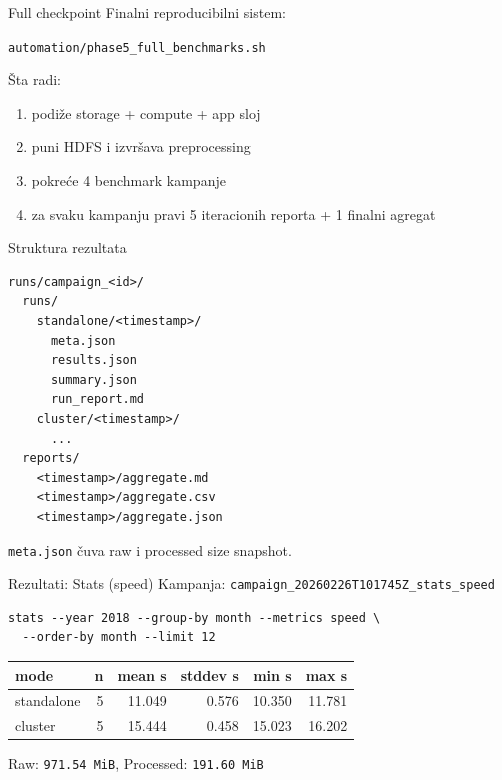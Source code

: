 \documentclass[aspectratio=169,11pt]{beamer}
\newcommand{\code}[1]{\texttt{\small #1}}
\begin{document}
\begin{frame}{Full checkpoint}
  Finalni reproducibilni sistem:
  \begin{center}
    \code{automation/phase5\_full\_benchmarks.sh}
  \end{center}

  \vspace{0.35cm}
  Šta radi:
  \begin{enumerate}
    \item podiže storage + compute + app sloj
    \item puni HDFS i izvršava preprocessing
    \item pokreće 4 benchmark kampanje
    \item za svaku kampanju pravi 5 iteracionih reporta + 1 finalni agregat
  \end{enumerate}
\end{frame}

\begin{frame}[fragile]{Struktura rezultata}
  \scriptsize
  \begin{verbatim}
runs/campaign_<id>/
  runs/
    standalone/<timestamp>/
      meta.json
      results.json
      summary.json
      run_report.md
    cluster/<timestamp>/
      ...
  reports/
    <timestamp>/aggregate.md
    <timestamp>/aggregate.csv
    <timestamp>/aggregate.json
  \end{verbatim}
  \normalsize

  \code{meta.json} čuva raw i processed size snapshot.
\end{frame}

\begin{frame}[fragile]{Rezultati: Stats (speed)}
  Kampanja: \code{campaign\_20260226T101745Z\_stats\_speed}

  \scriptsize
  \begin{verbatim}
stats --year 2018 --group-by month --metrics speed \
  --order-by month --limit 12
  \end{verbatim}
  \normalsize

  \begin{tabular}{lrrrrr}
    \toprule
    mode & n & mean s & stddev s & min s & max s \\
    \midrule
    standalone & 5 & 11.049 & 0.576 & 10.350 & 11.781 \\
    cluster & 5 & 15.444 & 0.458 & 15.023 & 16.202 \\
    \bottomrule
  \end{tabular}

  \vspace{0.25cm}
  Raw: \code{971.54 MiB}, Processed: \code{191.60 MiB}
\end{frame}
\end{document}
